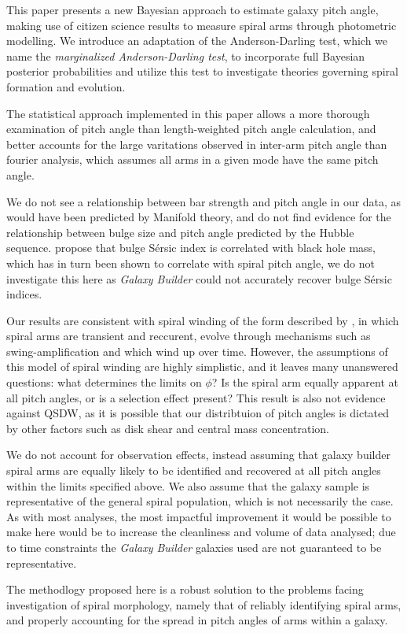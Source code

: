 This paper presents a new Bayesian approach to estimate galaxy pitch angle, making use of citizen science results to measure spiral arms through photometric modelling. We introduce an adaptation of the Anderson-Darling test, which we name the \textit{marginalized Anderson-Darling test}, to incorporate full Bayesian posterior probabilities and utilize this test to investigate theories governing spiral formation and evolution.

The statistical approach implemented in this paper allows a more thorough examination of pitch angle than length-weighted pitch angle calculation, and better accounts for the large varitations observed in inter-arm pitch angle than fourier analysis, which assumes all arms in a given mode have the same pitch angle.

We do not see a relationship between bar strength and pitch angle in our data, as would have been predicted by Manifold theory, and do not find evidence for the relationship between bulge size and pitch angle predicted by the Hubble sequence. \citet{2007ApJ...655...77G} propose that bulge S\'ersic index is correlated with black hole mass, which has in turn been shown to correlate with spiral pitch angle, we do not investigate this here as \textit{Galaxy Builder} could not accurately recover bulge S\'ersic indices.

Our results are consistent with spiral winding of the form described by \citet{2019arXiv190910291P}, in which spiral arms are transient and reccurent, evolve through mechanisms such as swing-amplification \citep{1965MNRAS.130..125G} and which wind up over time. However, the assumptions of this model of spiral winding are highly simplistic, and it leaves many unanswered questions: what determines the limits on $\phi$? Is the spiral arm equally apparent at all pitch angles, or is a selection effect present? This result is also not evidence against QSDW, as it is possible that our distribtuion of pitch angles is dictated by other factors such as disk shear and central mass concentration.

We do not account for observation effects, instead assuming that galaxy builder spiral arms are equally likely to be identified and recovered at all pitch angles within the limits specified above. We also assume that the galaxy sample is representative of the general spiral population, which is not necessarily the case. As with most analyses, the most impactful improvement it would be possible to make here would be to increase the cleanliness and volume of data analysed; due to time constraints the \textit{Galaxy Builder} galaxies used are not guaranteed to be representative.

The methodlogy proposed here is a robust solution to the problems facing investigation of spiral morphology, namely that of reliably identifying spiral arms, and properly accounting for the spread in pitch angles of arms within a galaxy.
